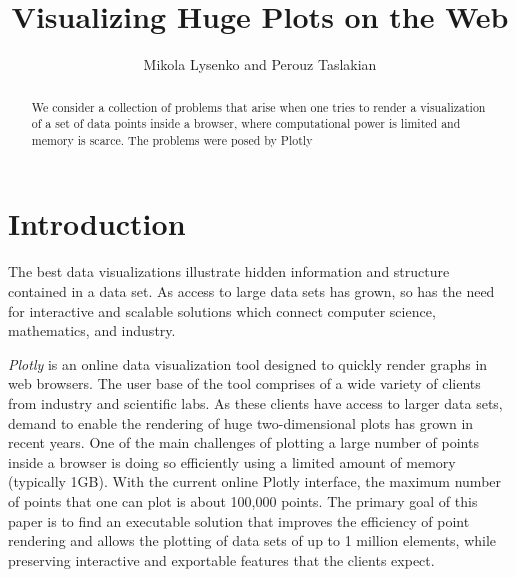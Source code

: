\documentclass[11pt,a4paper]{article}
\begin{document}
\title{Visualizing Huge Plots on the Web} 
\author{Mikola Lysenko and Perouz Taslakian}



\date{}

\maketitle



\begin{abstract}
We consider a collection of problems that arise when one 
tries to render a visualization of a set of data points inside a browser, 
where computational power is limited and memory is scarce. The problems were posed by Plotly
\end{abstract}

\section{Introduction}
The best data visualizations illustrate hidden information and structure 
contained in a data set. As access to large data sets has grown, so has the need for 
interactive and scalable solutions which connect computer science, mathematics, and industry. 

\emph{Plotly} is an online data visualization tool designed to quickly render graphs in web browsers. 
The user base of the tool comprises of a wide variety of clients from industry and scientific labs. 
As these clients have access to larger data sets, demand to enable the rendering of huge two-dimensional plots has grown in recent years. 
One of the main challenges of plotting a large number of points
inside a browser is doing so efficiently using a limited amount of memory (typically 1GB). 
With the current online Plotly interface, the maximum number of points that one can plot is about 100,000 points. 
The primary goal of this paper is to find an executable solution that 
improves the efficiency of point rendering and allows the plotting of data sets of up to 1 million elements, 
while preserving interactive and exportable features that the clients expect.
\end{document}
